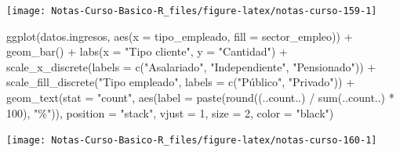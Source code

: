 \documentclass[
  12pt,
]{book}
\newenvironment{Shaded}{\begin{snugshade}}{\end{snugshade}}
\newcommand{\AttributeTok}[1]{\textcolor[rgb]{0.77,0.63,0.00}{#1}}
\newcommand{\DecValTok}[1]{\textcolor[rgb]{0.00,0.00,0.81}{#1}}
\newcommand{\FunctionTok}[1]{\textcolor[rgb]{0.00,0.00,0.00}{#1}}
\newcommand{\NormalTok}[1]{#1}
\newcommand{\SpecialCharTok}[1]{\textcolor[rgb]{0.00,0.00,0.00}{#1}}
\newcommand{\StringTok}[1]{\textcolor[rgb]{0.31,0.60,0.02}{#1}}
\begin{document}
\begin{center}\texttt{[image: Notas-Curso-Basico-R\_files/figure-latex/notas-curso-159-1]} \end{center}

\begin{Shaded}
\begin{Highlighting}[]
\FunctionTok{ggplot}\NormalTok{(datos.ingresos, }\FunctionTok{aes}\NormalTok{(}\AttributeTok{x =}\NormalTok{ tipo\_empleado, }\AttributeTok{fill =}\NormalTok{ sector\_empleo))  }\SpecialCharTok{+}
  \FunctionTok{geom\_bar}\NormalTok{() }\SpecialCharTok{+}
  \FunctionTok{labs}\NormalTok{(}\AttributeTok{x =} \StringTok{"Tipo cliente"}\NormalTok{, }\AttributeTok{y =} \StringTok{"Cantidad"}\NormalTok{) }\SpecialCharTok{+}
  \FunctionTok{scale\_x\_discrete}\NormalTok{(}\AttributeTok{labels =} \FunctionTok{c}\NormalTok{(}\StringTok{"Asalariado"}\NormalTok{, }\StringTok{"Independiente"}\NormalTok{, }\StringTok{"Pensionado"}\NormalTok{)) }\SpecialCharTok{+}
  \FunctionTok{scale\_fill\_discrete}\NormalTok{(}\StringTok{"Tipo empleado"}\NormalTok{,}
    \AttributeTok{labels =} \FunctionTok{c}\NormalTok{(}\StringTok{"Público"}\NormalTok{, }\StringTok{"Privado"}\NormalTok{)) }\SpecialCharTok{+}
  \FunctionTok{geom\_text}\NormalTok{(}\AttributeTok{stat =} \StringTok{"count"}\NormalTok{,}
    \FunctionTok{aes}\NormalTok{(}\AttributeTok{label =} \FunctionTok{paste}\NormalTok{(}\FunctionTok{round}\NormalTok{((..count..) }\SpecialCharTok{/} \FunctionTok{sum}\NormalTok{(..count..) }\SpecialCharTok{*} \DecValTok{100}\NormalTok{), }\StringTok{"\%"}\NormalTok{)),}
    \AttributeTok{position =} \StringTok{"stack"}\NormalTok{,}
    \AttributeTok{vjust =} \DecValTok{1}\NormalTok{,}
    \AttributeTok{size =} \DecValTok{2}\NormalTok{,}
    \AttributeTok{color =} \StringTok{"black"}\NormalTok{)}
\end{Highlighting}
\end{Shaded}

\begin{center}\texttt{[image: Notas-Curso-Basico-R\_files/figure-latex/notas-curso-160-1]} \end{center}
\end{document}
